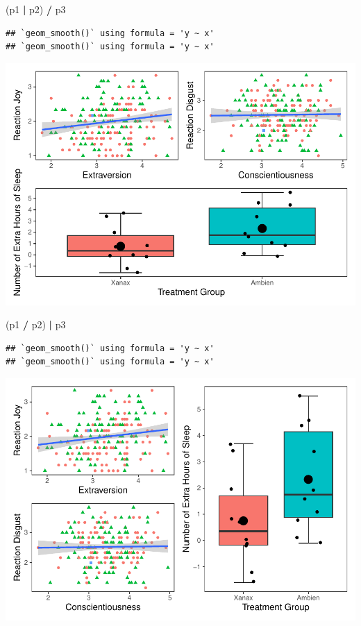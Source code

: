 \documentclass[
]{book}
\newenvironment{Shaded}{\begin{snugshade}}{\end{snugshade}}
\newcommand{\NormalTok}[1]{#1}
\newcommand{\SpecialCharTok}[1]{\textcolor[rgb]{0.81,0.36,0.00}{\textbf{#1}}}
\begin{document}
\begin{Shaded}
\begin{Highlighting}[]
\NormalTok{(p1 }\SpecialCharTok{|}\NormalTok{ p2) }\SpecialCharTok{/}\NormalTok{ p3}
\end{Highlighting}
\end{Shaded}

\begin{verbatim}
## `geom_smooth()` using formula = 'y ~ x'
## `geom_smooth()` using formula = 'y ~ x'
\end{verbatim}

\includegraphics{rintro_demo_files/figure-latex/unnamed-chunk-320-2.pdf}

\begin{Shaded}
\begin{Highlighting}[]
\NormalTok{(p1 }\SpecialCharTok{/}\NormalTok{ p2) }\SpecialCharTok{|}\NormalTok{ p3}
\end{Highlighting}
\end{Shaded}

\begin{verbatim}
## `geom_smooth()` using formula = 'y ~ x'
## `geom_smooth()` using formula = 'y ~ x'
\end{verbatim}

\includegraphics{rintro_demo_files/figure-latex/unnamed-chunk-320-3.pdf}
\end{document}
